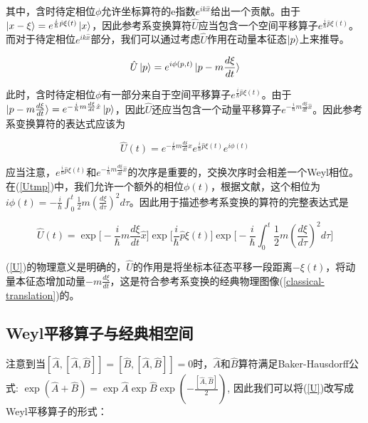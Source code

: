 \documentclass[a4paper]{article}
\begin{document}
        其中，含时待定相位$\phi$允许坐标算符的e指数$e^{ik\hat{x}}$给出一个贡献。由于$\ket{x-\xi}=e^{\frac{i}{\hbar}\hat{p}\xi(t)}\ket{x}$，因此参考系变换算符$\hat{U}$应当包含一个空间平移算子$e^{\frac{i}{\hbar}\hat{p}\xi(t)}$。而对于待定相位$e^{ik\hat{x}}$部分，我们可以通过考虑$\hat{U}$作用在动量本征态$\ket{p}$上来推导。

        \begin{equation}
            \hat{U}\ket{p}=e^{i\phi(p,t)}\ket{p-m\frac{d\xi}{dt}}
        \end{equation}

        此时，含时待定相位$\phi$有一部分来自于空间平移算子$e^{\frac{i}{\hbar}\hat{p}\xi(t)}$。由于$\ket{p-m\frac{d\xi}{dt}}=e^{-\frac{i}{\hbar}m\frac{d\xi}{dt}\hat{x}}\ket{p}$，因此$\hat{U}$还应当包含一个动量平移算子$e^{-\frac{i}{\hbar}m\frac{d\xi}{dt}\hat{x}}$。因此参考系变换算符的表达式应该为

        \begin{equation}\label{Utmp}
            \hat{U}(t)=e^{-\frac{i}{\hbar}m\frac{d\xi}{dt}\hat{x}}e^{\frac{i}{\hbar}\hat{p}\xi(t)}e^{i\phi(t)} 
        \end{equation}

        应当注意，$e^{\frac{i}{\hbar}\hat{p}\xi(t)}$和$e^{-\frac{i}{\hbar}m\frac{d\xi}{dt}\hat{x}}$的次序是重要的，交换次序时会相差一个Weyl相位。在(\ref{Utmp})中，我们允许一个额外的相位$\phi(t)$，根据文献\cite{bib:three,bib:eight}，这个相位为$i\phi(t)=-\frac{i}{\hbar}\int_0^t\frac{1}{2}m(\frac{d \xi}{d\tau})^2 d\tau$。因此用于描述参考系变换的算符的完整表达式是

        \begin{equation}\label{U}
            \hat{U}(t) = \exp\biggl[-\frac{i}{\hbar}m\frac{d\xi}{dt}\hat{x}\biggr] \exp\biggl[\frac{i}{\hbar}\hat{p}\xi(t)\biggr] \exp\biggl[-\frac{i}{\hbar}\int_0^t\frac{1}{2}m(\frac{d \xi}{d\tau})^2 d\tau\biggr]
        \end{equation}

        (\ref{U})的物理意义是明确的，$\hat{U}$的作用是将坐标本征态平移一段距离$-\xi(t)$，将动量本征态增加动量$-m\frac{d \xi}{dt}$，这是符合参考系变换的经典物理图像(\ref{classical-translation})的。


    \subsection{Weyl平移算子与经典相空间}

        注意到当$[\hat{A}, [\hat{A}, \hat{B}]]=[\hat{B}, [\hat{A}, \hat{B}]]=0$时，$\hat{A}$和$\hat{B}$算符满足Baker-Hausdorff公式: $\exp(\hat{A}+\hat{B})=\exp\hat{A} \exp\hat{B} \exp(-\frac{[\hat{A}, \hat{B}]}{2})$, 因此我们可以将(\ref{U})改写成Weyl平移算子的形式：
\end{document}
